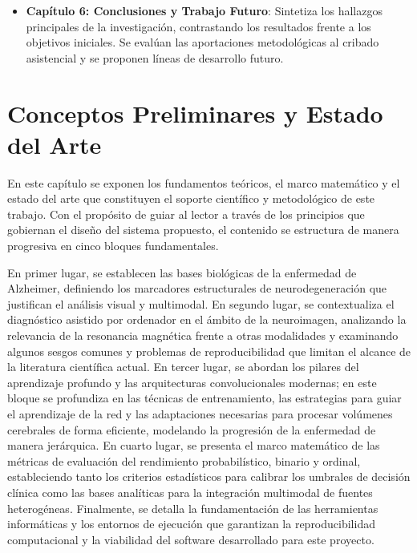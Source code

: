 \documentclass[12pt, oneside, english, spanish]{book}
\begin{document}
\begin{itemize}
	\item \textbf{Capítulo 6: Conclusiones y Trabajo Futuro}: Sintetiza los hallazgos principales de la investigación, contrastando los resultados frente a los objetivos iniciales. Se evalúan las aportaciones metodológicas al cribado asistencial y se proponen líneas de desarrollo futuro.
\end{itemize}

\chapter{Conceptos Preliminares y Estado del Arte} \label{chap:fundamentos_teoricos}
 
En este capítulo se exponen los fundamentos teóricos, el marco matemático y el estado del arte que constituyen el soporte científico y metodológico de este trabajo. Con el propósito de guiar al lector a través de los principios que gobiernan el diseño del sistema propuesto, el contenido se estructura de manera progresiva en cinco bloques fundamentales.

En primer lugar, se establecen las bases biológicas de la enfermedad de Alzheimer, definiendo los marcadores estructurales de neurodegeneración que justifican el análisis visual y multimodal. En segundo lugar, se contextualiza el diagnóstico asistido por ordenador en el ámbito de la neuroimagen, analizando la relevancia de la resonancia magnética frente a otras modalidades y examinando algunos sesgos comunes y problemas de reproducibilidad que limitan el alcance de la literatura científica actual. En tercer lugar, se abordan los pilares del aprendizaje profundo y las arquitecturas convolucionales modernas; en este bloque se profundiza en las técnicas de entrenamiento, las estrategias para guiar el aprendizaje de la red y las adaptaciones necesarias para procesar volúmenes cerebrales de forma eficiente, modelando la progresión de la enfermedad de manera jerárquica. En cuarto lugar, se presenta el marco matemático de las métricas de evaluación del rendimiento probabilístico, binario y ordinal, estableciendo tanto los criterios estadísticos para calibrar los umbrales de decisión clínica como las bases analíticas para la integración multimodal de fuentes heterogéneas. Finalmente, se detalla la fundamentación de las herramientas informáticas y los entornos de ejecución que garantizan la reproducibilidad computacional y la viabilidad del software desarrollado para este proyecto.
\end{document}
